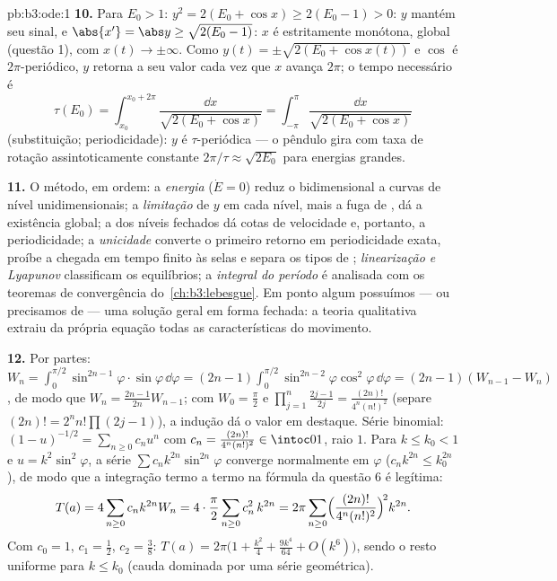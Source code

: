 \begin{solution}{pb:b3:ode:1}
\textbf{10.} Para $E_0 > 1$: $y^2 = 2(E_0 + \cos x) \geq
2(E_0 - 1) > 0$: $y$ mantém seu sinal, e $\abs{x'} = \abs y
\geq \sqrt{2(E_0 - 1)}$: $x$ é estritamente monótona, global
(questão 1), com $x(t) \to \pm\infty$. Como $y(t) =
\pm\sqrt{2(E_0 + \cos x(t))}$ e $\cos$ é $2\pi$-periódico,
$y$ retorna a seu valor cada vez que $x$ avança $2\pi$;
o tempo necessário é
\[
\tau(E_0) = \int_{x_0}^{x_0 + 2\pi}\frac{\dd
x}{\sqrt{2(E_0 + \cos x)}} =
\int_{-\pi}^{\pi}\frac{\dd x}{\sqrt{2(E_0 + \cos x)}}
\]
(substituição; periodicidade): $y$ é $\tau$-periódica ---
o pêndulo gira com taxa de rotação assintoticamente constante
$2\pi/\tau \approx \sqrt{2E_0}$ para energias grandes.

\textbf{11.} O método, em ordem: a \emph{energia} ($\dot E =
0$) reduz o  bidimensional a curvas de nível
unidimensionais; a \emph{limitação} de $y$ em cada nível, mais a
fuga de , dá a existência global; a
\emph{} dos níveis fechados dá cotas de velocidade
e, portanto, a periodicidade; a \emph{unicidade} converte o
primeiro retorno em periodicidade exata, proíbe a chegada em tempo
finito às selas e separa os tipos de ;
\emph{linearização e Lyapunov} classificam os equilíbrios;
a \emph{integral do período} é analisada com os teoremas de convergência
do~\cref{ch:b3:lebesgue}. Em ponto algum possuímos --- ou
precisamos de --- uma solução geral em forma fechada: a
teoria qualitativa extraiu da própria equação todas as
características do movimento.

\textbf{12.} Por partes: $W_n = \int_0^{\pi/2}\sin^{2n-1}\varphi
\cdot\sin\varphi\,\dd\varphi = (2n-1)\int_0^{\pi/2}
\sin^{2n-2}\varphi\cos^2\varphi\,\dd\varphi = (2n-1)(W_{n-1}
- W_n)$, de modo que $W_n = \frac{2n-1}{2n}W_{n-1}$; com $W_0 =
\frac\pi2$ e $\prod_{j=1}^n\frac{2j-1}{2j} =
\frac{(2n)!}{4^n(n!)^2}$ (separe $(2n)! = 2^nn!\prod(2j-1)$),
a indução dá o valor em destaque. Série binomial: $(1 -
u)^{-1/2} = \sum_{n\geq0}c_nu^n$ com $c_n =
\frac{(2n)!}{4^n(n!)^2} \in \intoc01$, raio $1$. Para $k
\leq k_0 < 1$ e $u = k^2\sin^2\varphi$, a série
$\sum c_nk^{2n}\sin^{2n}\varphi$ converge normalmente em
$\varphi$ ($c_nk^{2n} \leq k_0^{2n}$), de modo que a integração
termo a termo na fórmula da questão 6 é legítima:
\[
T(a) = 4\sum_{n\geq0}c_nk^{2n}W_n
= 4\cdot\frac\pi2\sum_{n\geq0}c_n^2\,k^{2n}
= 2\pi\sum_{n\geq0}
\Bigl(\frac{(2n)!}{4^n(n!)^2}\Bigr)^{\!2}k^{2n} .
\]
Com $c_0 = 1$, $c_1 = \frac12$, $c_2 = \frac38$: $T(a) =
2\pi\bigl(1 + \frac{k^2}4 + \frac{9k^4}{64} + O(k^6)\bigr)$,
sendo o resto uniforme para $k \leq k_0$ (cauda dominada por uma
série geométrica).


\end{solution}
